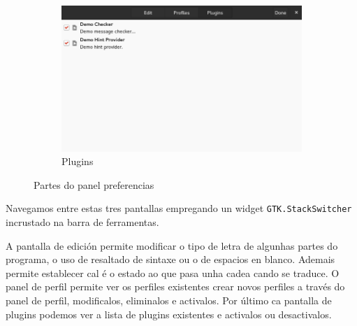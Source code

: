 \begin{figure}[h!]
\begin{subfigure}[b]{0.56\textwidth}
    \includegraphics[width=\textwidth]{img/panel_preferencias_plugins.png}
    \caption{Plugins}
  \end{subfigure}
    \caption{Partes do panel preferencias}
    \label{fig:ui:panel:preferences}
\end{figure}

Navegamos entre estas tres pantallas empregando un widget \lstinline{GTK.StackSwitcher} incrustado na barra de ferramentas.

A pantalla de edición permite modificar o tipo de letra de algunhas partes do programa, o uso de resaltado de sintaxe ou o de espacios en blanco. Ademais permite establecer cal é o estado ao que pasa unha cadea cando se traduce. O panel de perfil permite ver os perfiles existentes crear novos perfiles a través do panel de perfil, modificalos, eliminalos e activalos. Por último ca pantalla de plugins podemos ver a lista de plugins existentes e activalos ou desactivalos.


